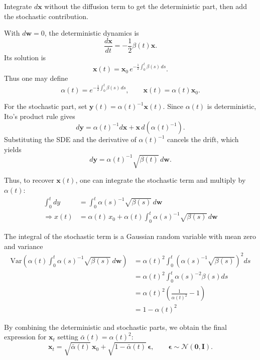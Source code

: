 \begin{compactproof}[title={Proof}]
 Integrate $d\mathbf{x}$ without the diffusion term to get the
deterministic part, then add the stochastic contribution.

 With $d\mathbf{w}=0$, the deterministic dynamics is
\[
    \frac{d\mathbf{x}}{dt}
    =
    -\frac{1}{2}\beta(t)\mathbf{x}.
\]
Its solution is
\[
    \mathbf{x}(t)
    =
    \mathbf{x}_0
    \, e^{
        -\frac{1}{2}\int_0^t \beta(s)\,ds}.
\]
Thus one may define
\[
    \alpha(t)
    = e^{
        -\frac{1}{2}\int_0^t \beta(s)\,ds},
    \qquad
    \mathbf{x}(t)=\alpha(t)\mathbf{x}_0.
\]

 For the stochastic part, set
$\mathbf{y}(t)=\alpha(t)^{-1}\mathbf{x}(t)$. Since $\alpha(t)$ is deterministic,
Ito's product rule gives
\[
    d\mathbf{y}
    =
    \alpha(t)^{-1}d\mathbf{x}
    +
    \mathbf{x}\,d(\alpha(t)^{-1}).
\]
Substituting the SDE and the derivative of $\alpha(t)^{-1}$ cancels the drift,
which yields
\[
    d\mathbf{y}
    =
    \alpha(t)^{-1}\sqrt{\beta(t)}\,d\mathbf{w}.
\]

Thus, to recover $\mathbf{x}(t)$, one can integrate the stochastic term and multiply by $\alpha(t)$:
\begin{align*}
    \int_{0}^{t} dy &= \int_{0}^{t} \alpha(s)^{-1}\sqrt{\beta(s)}\,d\mathbf{w} \\
    \Rightarrow x(t) &= \alpha(t) \, x_0 + \alpha(t) \int_{0}^{t} \alpha(s)^{-1}\sqrt{\beta(s)}\,d\mathbf{w}
\end{align*}

 The integral of the stochastic term is a Gaussian random variable with mean zero and variance
\begin{align*}
    \text{Var}\left(\alpha(t) \int_{0}^{t} \alpha(s)^{-1}\sqrt{\beta(s)}\,d\mathbf{w}\right)
    &= \alpha(t)^2 \int_{0}^{t} (\alpha(s)^{-1}\sqrt{\beta(s)})^2 ds \\
    &= \alpha(t)^2 \int_{0}^{t} \alpha(s)^{-2} \beta(s) ds \\
    &= \alpha(t)^2 \left( \frac{1}{\alpha(t)^2} -1 \right) \\
    &= 1 - \alpha(t)^2
\end{align*}


 By combining the deterministic and stochastic parts, we obtain the final expression for $\mathbf{x}_t$ setting $\bar{\alpha}(t) = \alpha(t)^2$:
\begin{equation*}
\boxed{
    \mathbf{x}_t
    =
    \sqrt{\bar{\alpha}(t)}\,\mathbf{x}_0
    +
    \sqrt{1-\bar{\alpha}(t)}\,\boldsymbol{\epsilon},
    \qquad
    \boldsymbol{\epsilon}\sim\mathcal{N}(\mathbf{0},\mathbf{I}).
}
\end{equation*}
\qedcompact
\end{compactproof}

